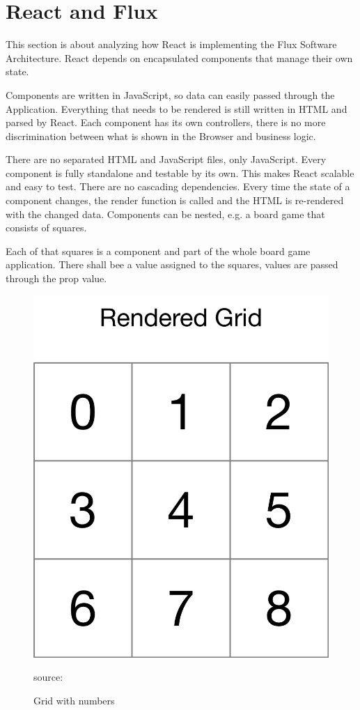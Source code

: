 \section{React and Flux}
This section is about analyzing how React is implementing the Flux Software Architecture. React depends on encapsulated components that manage their own state. 

Components are written in JavaScript, so data can easily passed through the Application. Everything that needs to be rendered is still written in HTML and parsed by React. Each component has its own controllers, there is no more discrimination between what is shown in the Browser and business logic.

There are no separated HTML and JavaScript files, only JavaScript. Every component is fully standalone and testable by its own. This makes React scalable and easy to test. There are no cascading dependencies. Every time the state of a component changes, the render function is called and the HTML is re-rendered with the changed data. Components can be nested, e.g. a board game that consists of squares.




Each of that squares is a component and part of the whole board game application. There shall bee a value assigned to the squares, values are passed through the prop value.




\begin{figure}[H]
	\centering
	\includegraphics[width=0.5\linewidth]{bilder/grundlagen/GameGrid.png}
	\caption{Grid with numbers} source:\cite{ReactLogo}
	\label{fig:RL}
\end{figure}

